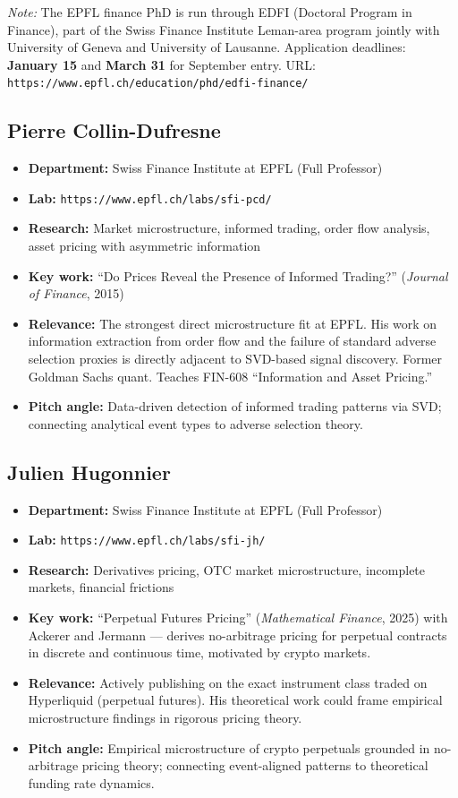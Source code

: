 \documentclass[11pt,a4paper]{article}
\newcommand{\url}[1]{\texttt{#1}}
\begin{document}
\textit{Note:} The EPFL finance PhD is run through EDFI (Doctoral Program in Finance), part of the Swiss Finance Institute Leman-area program jointly with University of Geneva and University of Lausanne. Application deadlines: \textbf{January 15} and \textbf{March 31} for September entry. URL: \url{https://www.epfl.ch/education/phd/edfi-finance/}

\subsection{Pierre Collin-Dufresne}
\begin{itemize}
  \item \textbf{Department:} Swiss Finance Institute at EPFL (Full Professor)
  \item \textbf{Lab:} \url{https://www.epfl.ch/labs/sfi-pcd/}
  \item \textbf{Research:} Market microstructure, informed trading, order flow analysis, asset pricing with asymmetric information
  \item \textbf{Key work:} ``Do Prices Reveal the Presence of Informed Trading?'' (\textit{Journal of Finance}, 2015)
  \item \textbf{Relevance:} The strongest direct microstructure fit at EPFL. His work on information extraction from order flow and the failure of standard adverse selection proxies is directly adjacent to SVD-based signal discovery. Former Goldman Sachs quant. Teaches FIN-608 ``Information and Asset Pricing.''
  \item \textbf{Pitch angle:} Data-driven detection of informed trading patterns via SVD; connecting analytical event types to adverse selection theory.
\end{itemize}

\subsection{Julien Hugonnier}
\begin{itemize}
  \item \textbf{Department:} Swiss Finance Institute at EPFL (Full Professor)
  \item \textbf{Lab:} \url{https://www.epfl.ch/labs/sfi-jh/}
  \item \textbf{Research:} Derivatives pricing, OTC market microstructure, incomplete markets, financial frictions
  \item \textbf{Key work:} ``Perpetual Futures Pricing'' (\textit{Mathematical Finance}, 2025) with Ackerer and Jermann --- derives no-arbitrage pricing for perpetual contracts in discrete and continuous time, motivated by crypto markets.
  \item \textbf{Relevance:} Actively publishing on the exact instrument class traded on Hyperliquid (perpetual futures). His theoretical work could frame empirical microstructure findings in rigorous pricing theory.
  \item \textbf{Pitch angle:} Empirical microstructure of crypto perpetuals grounded in no-arbitrage pricing theory; connecting event-aligned patterns to theoretical funding rate dynamics.
\end{itemize}
\end{document}
